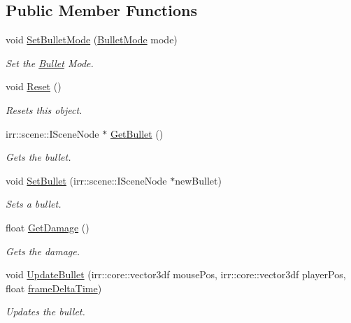 \subsection*{Public Member Functions}
\begin{DoxyCompactItemize}
\item 
void \hyperlink{class_bullet_a9988e27a0327a7ebca6b407c59661a54}{Set\-Bullet\-Mode} (\hyperlink{class_bullet_a5d75af562dbb5f6f4f68584ca9193aa5}{Bullet\-Mode} mode)
\begin{DoxyCompactList}\small\item\em Set the \hyperlink{class_bullet}{Bullet} Mode. \end{DoxyCompactList}\item 
void \hyperlink{class_bullet_a2de1bc8fb8c70cce09385efd11e9156c}{Reset} ()
\begin{DoxyCompactList}\small\item\em Resets this object. \end{DoxyCompactList}\item 
irr\-::scene\-::\-I\-Scene\-Node $\ast$ \hyperlink{class_bullet_ab9ae469bacf54dfaa69e94b9ead0a908}{Get\-Bullet} ()
\begin{DoxyCompactList}\small\item\em Gets the bullet. \end{DoxyCompactList}\item 
void \hyperlink{class_bullet_a6b68bd110c7a9729c76ae4dc9906e7e7}{Set\-Bullet} (irr\-::scene\-::\-I\-Scene\-Node $\ast$new\-Bullet)
\begin{DoxyCompactList}\small\item\em Sets a bullet. \end{DoxyCompactList}\item 
float \hyperlink{class_bullet_a1fed697f50973eae024e1ce9deeb0442}{Get\-Damage} ()
\begin{DoxyCompactList}\small\item\em Gets the damage. \end{DoxyCompactList}\item 
void \hyperlink{class_bullet_a22c11bea0caf412bcc62ddf13dc541c7}{Update\-Bullet} (irr\-::core\-::vector3df mouse\-Pos, irr\-::core\-::vector3df player\-Pos, float \hyperlink{_player_8cpp_adc988571147642cda93afbf89783f9c9}{frame\-Delta\-Time})
\begin{DoxyCompactList}\small\item\em Updates the bullet. \end{DoxyCompactList}\item 

\end{DoxyCompactItemize}
